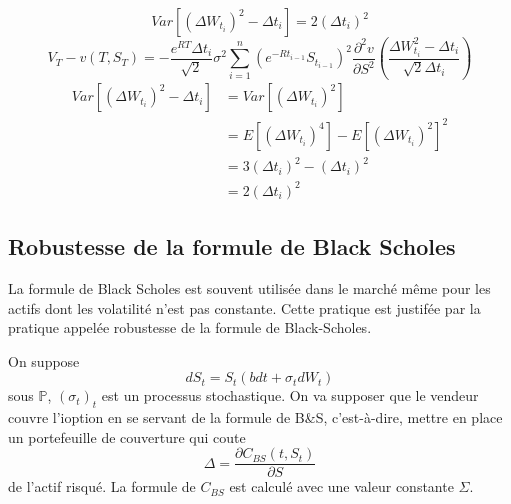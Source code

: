\documentclass{article}
\theoremstyle{plain}
\theoremstyle{definition}
\begin{document}
\begin{equation}
Var[(\Delta W_{t_i})^2-\Delta t_i]=2(\Delta t_i)^2
\end{equation}
\begin{equation}
V_T-v(T,S_T)=-\frac{e^{RT}\Delta t_i}{\sqrt{2}}\sigma^2\sum_{i=1}^n (e^{-Rt_{i-1}}S_{t_{i-1}})^2\frac{\partial^2 v}{\partial S^2}(\frac{\Delta W_{t_i}^2-\Delta t_i}{\sqrt{2}\Delta t_i})
\end{equation}
\begin{equation}
\begin{split}
Var[(\Delta W_{t_i})^2-\Delta t_i]&=Var[(\Delta W_{t_i})^2]\\
&=E[(\Delta W_{t_i})^4]-E[(\Delta W_{t_i})^2]^2\\
&=3(\Delta t_i)^2-(\Delta t_i)^2\\
&=2(\Delta t_i)^2
\end{split}
\end{equation}

\subsection{Robustesse de la formule de Black Scholes}
La formule de Black Scholes est souvent utilis\'ee dans le march\'e m\^eme pour les actifs dont les volatilit\'e n'est pas constante. Cette pratique est justif\'ee par la pratique appel\'ee robustesse de la formule de Black-Scholes.

On suppose 
\begin{equation}
dS_t=S_t (bdt+\sigma_t dW_t)
\end{equation}
sous $\mathbb{P}$, $(\sigma_t)_t$ est un processus stochastique. On va supposer que le vendeur couvre l'ioption en se servant de la formule de B\&S, c'est-\`a-dire, mettre en place un portefeuille de couverture qui coute
\begin{equation}
\Delta=\frac{\partial C_{BS}(t,S_t)}{\partial S}
\end{equation}
de l'actif risqu\'e. La formule de $C_{BS}$ est calcul\'e avec une valeur constante $\Sigma$.
\end{document}
